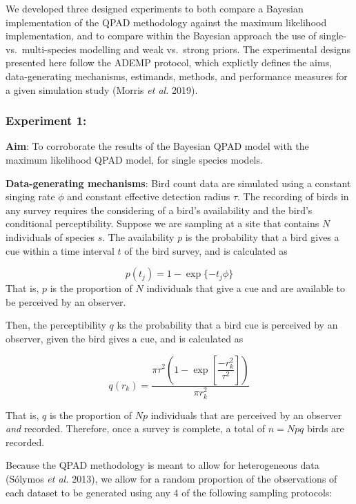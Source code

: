 \documentclass[
  11pt,
]{article}
\begin{document}
We developed three designed experiments to both compare a Bayesian
implementation of the QPAD methodology against the maximum likelihood
implementation, and to compare within the Bayesian approach the use of
single- vs.~multi-species modelling and weak vs.~strong priors. The
experimental designs presented here follow the ADEMP protocol, which
explictly defines the aims, data-generating mechanisms, estimands,
methods, and performance measures for a given simulation study (Morris
\emph{et al.} 2019).

\hypertarget{experiment-1}{%
\subsubsection{Experiment 1:}\label{experiment-1}}

\textbf{Aim}: To corroborate the results of the Bayesian QPAD model with
the maximum likelihood QPAD model, for single species models.

\textbf{Data-generating mechanisms}: Bird count data are simulated using
a constant singing rate \(\phi\) and constant effective detection radius
\(\tau\). The recording of birds in any survey requires the considering
of a bird's availability and the bird's conditional perceptibility.
Suppose we are sampling at a site that contains \(N\) individuals of
species \(s\). The availability \(p\) is the probability that a bird
gives a cue within a time interval \(t\) of the bird survey, and is
calculated as

\[
  p(t_j) = 1 - \exp\{-t_j \phi\}
\] That is, \(p\) is the proportion of \(N\) individuals that give a cue
and are available to be perceived by an observer.

Then, the perceptibility \(q\) ks the probability that a bird cue is
perceived by an observer, given the bird gives a cue, and is calculated
as

\[
  q(r_k) = \dfrac{\pi\tau^2\left(1-\exp\left[\dfrac{-r_k^2}{\tau^2}\right]\right)}{\pi r_k^2}  
\]

That is, \(q\) is the proportion of \(Np\) individuals that are
perceived by an observer \emph{and} recorded. Therefore, once a survey
is complete, a total of \(n = Npq\) birds are recorded.

Because the QPAD methodology is meant to allow for heterogeneous data
(Sólymos \emph{et al.} 2013), we allow for a random proportion of the
observations of each dataset to be generated using any 4 of the
following sampling protocols:
\end{document}
